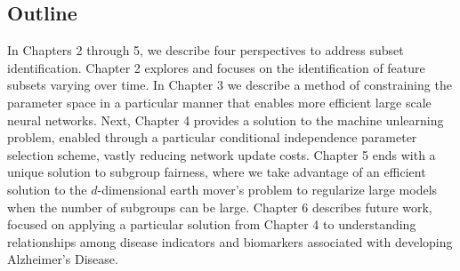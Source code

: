 \subsection{Outline}
In Chapters 2 through 5, we describe four perspectives to address subset identification.
Chapter 2 explores and focuses on the identification of feature subsets varying over time.
In Chapter 3 we describe a method of constraining the parameter space in a particular manner
that enables more efficient large scale neural networks.
Next, Chapter 4 provides a solution to the machine unlearning problem,
enabled through a particular conditional independence parameter selection scheme, vastly reducing network update costs.
Chapter 5 ends with a unique solution to subgroup fairness, 
where we take advantage of an efficient solution to
the $d$-dimensional earth mover's problem
to regularize large models when the number of subgroups can be large.
Chapter 6 describes future work, focused on applying a particular solution from Chapter 4 to understanding relationships among
disease indicators and biomarkers associated with developing Alzheimer's Disease.